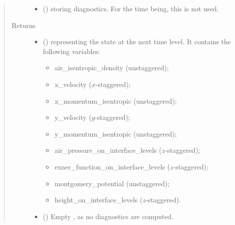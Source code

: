 \documentclass[letterpaper,10pt,english]{sphinxmanual}
\begin{document}
\begin{fulllineitems}
\begin{fulllineitems}
\begin{quote}
\begin{description}
\begin{itemize}
\item {} 
 () \textendash{} {\hyperref[\detokenize{api:tasmania.storages.grid_data.GridData}]{}} storing diagnostics.
For the time being, this is not used.

\end{itemize}

\item[{Returns}] \leavevmode
\begin{itemize}
\item {} 
 () \textendash{} {\hyperref[\detokenize{api:tasmania.storages.state_isentropic.StateIsentropic}]{}} representing the state at the next time level.
It contains the following variables:
\begin{itemize}
\item {} 
air\_isentropic\_density (unstaggered);

\item {} 
x\_velocity (\(x\)-staggered);

\item {} 
x\_momentum\_isentropic (unstaggered);

\item {} 
y\_velocity (\(y\)-staggered);

\item {} 
y\_momentum\_isentropic (unstaggered);

\item {} 
air\_pressure\_on\_interface\_levels (\(z\)-staggered);

\item {} 
exner\_function\_on\_interface\_levels (\(z\)-staggered);

\item {} 
montgomery\_potential (unstaggered);

\item {} 
height\_on\_interface\_levels (\(z\)-staggered).

\end{itemize}

\item {} 
 () \textendash{} Empty {\hyperref[\detokenize{api:tasmania.storages.grid_data.GridData}]{}}, as no diagnostics are computed.

\end{itemize}



\end{description}
\end{quote}
\end{fulllineitems}
\end{fulllineitems}
\end{document}
